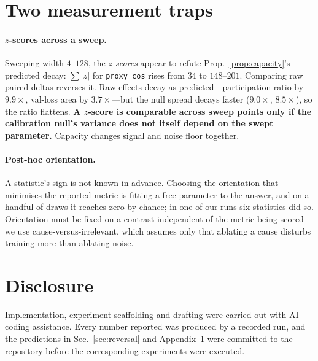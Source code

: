 \section{Two measurement traps}\label{app:traps}

\paragraph{$z$-scores across a sweep.} Sweeping width $4$--$128$, the
\emph{$z$-scores} appear to refute Prop.~\ref{prop:capacity}'s predicted decay:
$\sum|z|$ for \texttt{proxy\_cos} rises from $34$ to $148$--$201$. Comparing raw
paired deltas reverses it. Raw effects decay as predicted---participation ratio
by $9.9\times$, val-loss area by $3.7\times$---but the null spread decays faster
($9.0\times$, $8.5\times$), so the ratio flattens. \textbf{A $z$-score is
comparable across sweep points only if the calibration null's variance does not
itself depend on the swept parameter.} Capacity changes signal and noise floor
together.

\paragraph{Post-hoc orientation.} A statistic's sign is not known in advance.
Choosing the orientation that minimises the reported metric is fitting a free
parameter to the answer, and on a handful of draws it reaches zero by chance;
in one of our runs six statistics did so. Orientation must be fixed on a
contrast independent of the metric being scored---we use cause-versus-irrelevant,
which assumes only that ablating a cause disturbs training more than ablating
noise.

\section*{Disclosure}

Implementation, experiment scaffolding and drafting were carried out with AI
coding assistance. Every number reported was produced by a recorded run, and the
predictions in Sec.~\ref{sec:reversal} and Appendix~\ref{app:traps} were
committed to the repository before the corresponding experiments were executed.




